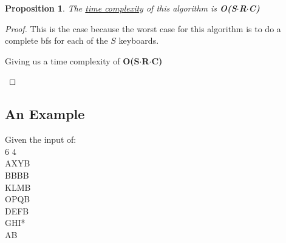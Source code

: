 \documentclass[12pt]{article}
\newtheorem{proposition}[theorem]{Proposition}
\begin{document}
\begin{proposition}
\label{numq}
The \underline{time complexity} of this algorithm is \textbf{O(S$\cdot$R$\cdot$C)}
\end{proposition}

\begin{proof}
This is the case because the worst case for this algorithm is to do a complete bfs for each of the $S$ keyboards.

\begin{center}
    Giving us a time complexity of \textbf{O(S$\cdot$R$\cdot$C)}
\end{center}
\end{proof}


\subsection{An Example}
Given the input of: \\
6 4     \\
AXYB    \\
BBBB    \\
KLMB    \\
OPQB    \\
DEFB    \\
GHI*    \\
AB      \\




\end{document}
